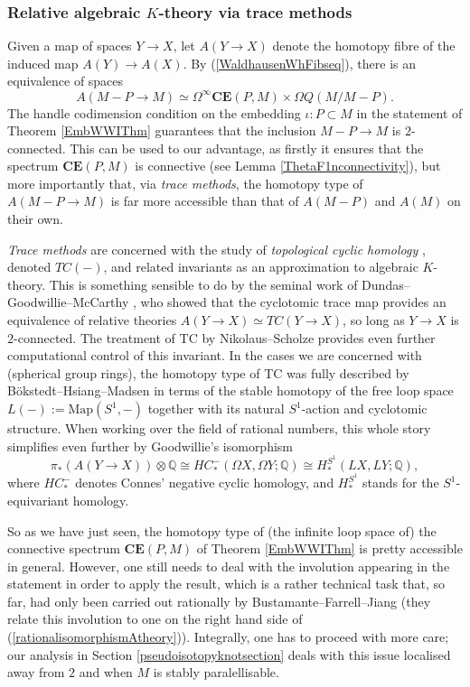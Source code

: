 \documentclass[a4paper, oneside]{amsart}
\newcommand{\1}{\mathds{1}}
\theoremstyle{remark}
\theoremstyle{definition}
\newcommand{\Q}{\mathbb{Q}}
\newcommand{\CEsp}{\mathbf{CE}}
\numberwithin{equation}{section}
\begin{document}
    

\subsubsection{Relative algebraic $K$-theory via trace methods}\label{relAtheorysubsubsection} Given a map of spaces $Y\to X$, let $A(Y\to X)$ denote the homotopy fibre of the induced map $A(Y)\to A(X)$. By (\ref{WaldhausenWhFibseq}), there is an equivalence of spaces
$$
A(M-P\to M)\simeq \Omega^\infty\CEsp(P,M)\times \Omega Q(M/M-P).
$$
The handle codimension condition on the embedding $\iota: P\subset M$ in the statement of Theorem \ref{EmbWWIThm} guarantees that the inclusion $M-P\to M$ is $2$-connected. This can be used to our advantage, as firstly it ensures that the spectrum $\CEsp(P,M)$ is connective (see Lemma \ref{ThetaF1nconnectivity}), but more importantly that, via \textit{trace methods}, the homotopy type of $A(M-P\to M)$ is far more accessible than that of $A(M-P)$ and $A(M)$ on their own.


\textit{Trace methods}  are concerned with the study of \emph{topological cyclic homology} \cite{BokHsiMadTC}, denoted $TC(-)$, and related invariants as an approximation to algebraic $K$-theory. This is something sensible to do by the seminal work of Dundas--Goodwillie--McCarthy \cite{DundasMcCarthy, Dundas1997, DundasGoodwillieMcCarthy}, who showed that the cyclotomic trace map provides an equivalence of relative theories $A(Y\to X)\simeq TC(Y\to X)$, so long as $Y\to X$ is $2$-connected. The treatment of TC by Nikolaus--Scholze \cite{NikolausScholze} provides even further computational control of this invariant. In the cases we are concerned with (spherical group rings), the homotopy type of TC was fully described by Bökstedt--Hsiang--Madsen \cite{BokHsiMadTC} in terms of the stable homotopy of the free loop space $L(-):=\mathrm{Map}(S^1,-)$ together with its natural $S^1$-action and cyclotomic structure. When working over the field of rational numbers, this whole story simplifies even further by Goodwillie's isomorphism \cite{GoodwillierelativeAtheory} 
\begin{equation}\label{rationalisomorphismAtheory}
\pi_*(A(Y\to X))\otimes \Q\cong HC^-_{*}(\Omega X, \Omega Y; \Q)\cong H^{S^1}_{*}(LX,LY;\Q), 
\end{equation}
where $HC^-_*$ denotes Connes' negative cyclic homology, and $H^{S^1}_*$ stands for the $S^1$-equivariant homology. 

So as we have just seen, the homotopy type of (the infinite loop space of) the connective spectrum $\CEsp(P,M)$ of Theorem \ref{EmbWWIThm} is pretty accessible in general. However, one still needs to deal with the involution appearing in the statement in order to apply the result, which is a rather technical task that, so far, had only been carried out rationally by Bustamante--Farrell--Jiang \cite{InvolutionAtheoryBustamanteFarrell} (they relate this involution to one on the right hand side of (\ref{rationalisomorphismAtheory})). Integrally, one has to proceed with more care; our analysis in Section \ref{pseudoisotopyknotsection} deals with this issue localised away from $2$ and when $M$ is stably paralellisable. 
\end{document}

